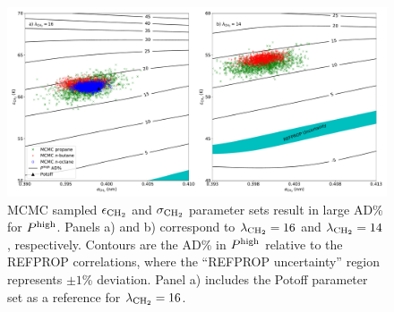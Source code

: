 \documentclass[journal=jctc,manuscript=article]{achemso}
\begin{document}

\begin{figure}[htb!]
	\centering
	\includegraphics[width=6.4in]{MCMC_Mie_14_16_propane_butane_octane}
	\caption{MCMC sampled $\epsilon_{\rm CH_2}$ and $\sigma_{\rm CH_2}$ parameter sets result in large AD\% for $P^{\rm high}$. Panels a) and b) correspond to $\lambda_{\rm CH_2} = 16$ and $\lambda_{\rm CH_2} = 14$, respectively. Contours are the AD\% in $P^{\rm high}$ relative to the REFPROP correlations, where the ``REFPROP uncertainty'' region represents $\pm 1$\% deviation. Panel a) includes the Potoff parameter set as a reference for $\lambda_{\rm CH_2} = 16$.}
	\label{fig:MCMC_Mie_14_16_propane_butane_octane}
\end{figure} 

\end{document}
